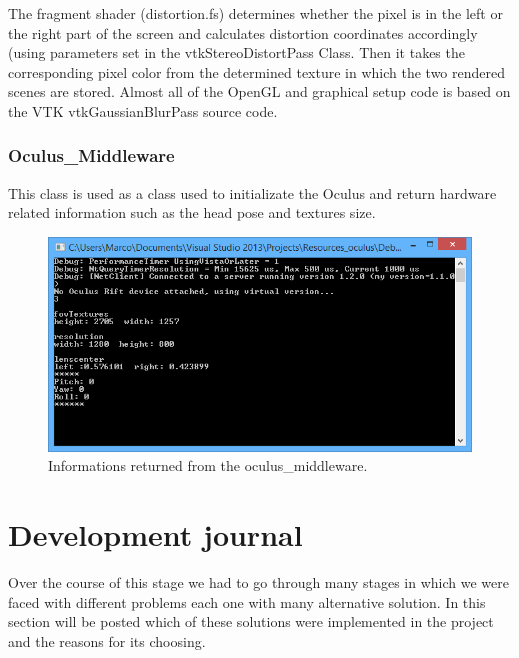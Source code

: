 \documentclass[11pt]{article} %
\begin{document}
The fragment shader (distortion.fs) determines whether the pixel is in the left or the right part of the screen and calculates distortion coordinates accordingly (using parameters set in the vtkStereoDistortPass Class. Then it takes the corresponding pixel color from the determined texture in which the two rendered scenes are stored.
Almost all of the OpenGL and graphical setup code is based on the VTK vtkGaussianBlurPass source code.

%

\FloatBarrier

\subsubsection{Oculus\_Middleware}
This class is used as a class used to initializate the Oculus and return hardware related information such as the head pose and textures size.

\begin{figure}[h!]
	\includegraphics[width=1.0\linewidth]{img/rift_middleware.PNG}
  	\caption{Informations returned from the oculus\_middleware.}
\end{figure}





\newpage

\section{Development journal}
Over the course of this stage we had to go through many stages in which we were faced with different problems each one with many alternative solution. In this section will be posted which of these solutions were implemented in the project and the reasons for its choosing. 
\end{document}

